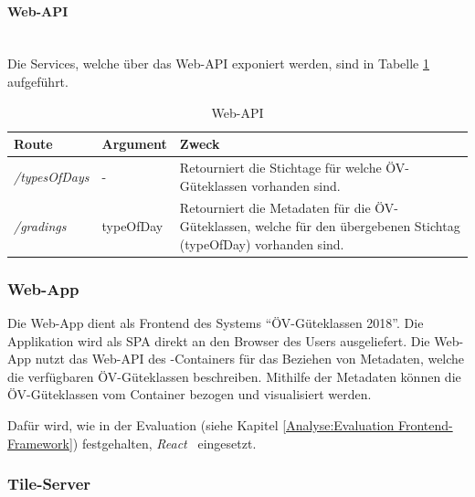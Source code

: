 \paragraph{Web-\ac{API}}~\\
Die Services, welche über das Web-\ac{API} exponiert werden, sind in Tabelle \ref{table:Wep-API} aufgeführt.

\begin{table}[H]
    \centering
    \begin{tabular}[c]{l l p{10.5cm}}
        \toprule
        \textbf{Route}          
                                & \textbf{Argument}
                                & \textbf{Zweck}\\
        \midrule
        \emph{/typesOfDays}
                                & -
                                & Retourniert die Stichtage für welche \acs{ÖV}-Güteklassen vorhanden sind.\\
        \emph{/gradings}        & typeOfDay
                                & Retourniert die Metadaten für die \acs{ÖV}-Güteklassen, welche für den übergebenen Stichtag (typeOfDay) vorhanden sind.\\
        \bottomrule
    \end{tabular}
    \caption{Web-\ac{API}}
    \label{table:Wep-API}
\end{table}


\subsubsection{Web-App}
\label{container:Web-App}

Die Web-App dient als Frontend des Systems "`\acs{ÖV}-Güteklassen 2018"'.
Die Applikation wird als \ac{SPA} direkt an den Browser des Users ausgeliefert.
Die Web-App nutzt das Web-\ac{API} des -Containers für das Beziehen von Metadaten, welche die verfügbaren ÖV-Güteklassen beschreiben.
Mithilfe der Metadaten können die ÖV-Güteklassen vom Container  bezogen und visualisiert werden.

Dafür wird, wie in der Evaluation (siehe Kapitel \ref{Analyse:Evaluation Frontend-Framework}) festgehalten, \emph{React}~\cite{react} eingesetzt.

\subsubsection{Tile-Server}
\label{container:Tile-Server}

